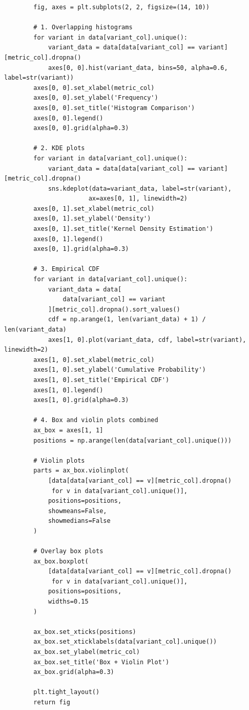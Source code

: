 \begin{lstlisting}
        fig, axes = plt.subplots(2, 2, figsize=(14, 10))

        # 1. Overlapping histograms
        for variant in data[variant_col].unique():
            variant_data = data[data[variant_col] == variant][metric_col].dropna()
            axes[0, 0].hist(variant_data, bins=50, alpha=0.6, label=str(variant))
        axes[0, 0].set_xlabel(metric_col)
        axes[0, 0].set_ylabel('Frequency')
        axes[0, 0].set_title('Histogram Comparison')
        axes[0, 0].legend()
        axes[0, 0].grid(alpha=0.3)

        # 2. KDE plots
        for variant in data[variant_col].unique():
            variant_data = data[data[variant_col] == variant][metric_col].dropna()
            sns.kdeplot(data=variant_data, label=str(variant),
                       ax=axes[0, 1], linewidth=2)
        axes[0, 1].set_xlabel(metric_col)
        axes[0, 1].set_ylabel('Density')
        axes[0, 1].set_title('Kernel Density Estimation')
        axes[0, 1].legend()
        axes[0, 1].grid(alpha=0.3)

        # 3. Empirical CDF
        for variant in data[variant_col].unique():
            variant_data = data[
                data[variant_col] == variant
            ][metric_col].dropna().sort_values()
            cdf = np.arange(1, len(variant_data) + 1) / len(variant_data)
            axes[1, 0].plot(variant_data, cdf, label=str(variant), linewidth=2)
        axes[1, 0].set_xlabel(metric_col)
        axes[1, 0].set_ylabel('Cumulative Probability')
        axes[1, 0].set_title('Empirical CDF')
        axes[1, 0].legend()
        axes[1, 0].grid(alpha=0.3)

        # 4. Box and violin plots combined
        ax_box = axes[1, 1]
        positions = np.arange(len(data[variant_col].unique()))

        # Violin plots
        parts = ax_box.violinplot(
            [data[data[variant_col] == v][metric_col].dropna()
             for v in data[variant_col].unique()],
            positions=positions,
            showmeans=False,
            showmedians=False
        )

        # Overlay box plots
        ax_box.boxplot(
            [data[data[variant_col] == v][metric_col].dropna()
             for v in data[variant_col].unique()],
            positions=positions,
            widths=0.15
        )

        ax_box.set_xticks(positions)
        ax_box.set_xticklabels(data[variant_col].unique())
        ax_box.set_ylabel(metric_col)
        ax_box.set_title('Box + Violin Plot')
        ax_box.grid(alpha=0.3)

        plt.tight_layout()
        return fig

\end{lstlisting}

